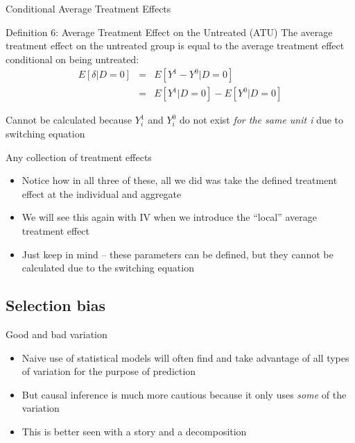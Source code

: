 \documentclass{beamer}
\begin{document}
\begin{frame}{Conditional Average Treatment Effects}

  \begin{block}{Definition 6: Average Treatment Effect on the Untreated (ATU)}
    The average treatment effect on the untreated group is equal to the average treatment effect conditional on being untreated:
    \begin{eqnarray*}
      E[\delta|D=0]&=&E[Y^1-Y^0|D=0] \nonumber \\
      &=&E[Y^1|D=0]-E[Y^0|D=0]
    \end{eqnarray*}
  \end{block}
  Cannot be calculated because $Y^1_i$ and $Y^0_i$ do not exist \emph{for the same unit i} due to switching equation

\end{frame}


\begin{frame}{Any collection of treatment effects}

  \begin{itemize}
    \item Notice how in all three of these, all we did was take the defined treatment effect at the individual and aggregate
    \item We will see this again with IV when we introduce the ``local'' average treatment effect
    \item Just keep in mind -- these parameters can be defined, but they cannot be calculated due to the switching equation
  \end{itemize}

\end{frame}

\subsection{Selection bias}

\begin{frame}{Good and bad variation}

  \begin{itemize}
    \item Naive use of statistical models will often find and take advantage of all types of variation for the purpose of prediction
    \item But causal inference is much more cautious because it only uses \emph{some} of the variation
    \item This is better seen with a story and a decomposition
  \end{itemize}

\end{frame}
\end{document}
